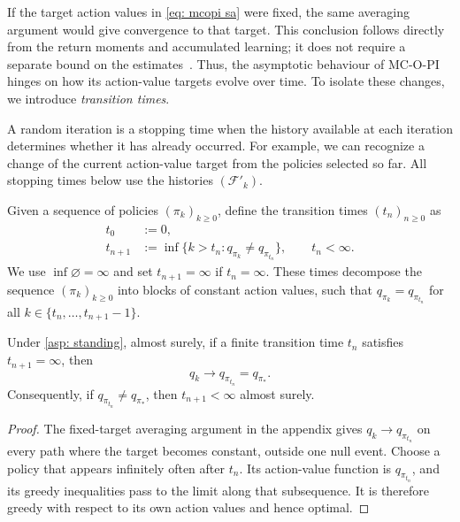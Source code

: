 
If the target action values in \eqref{eq: mcopi sa} were fixed, the same averaging argument would give convergence to that target. This conclusion follows directly from the return moments and accumulated learning; it does not require a separate bound on the estimates~\citep[Proposition~4.2]{Bertsekas1996Neuro-DynamicProgramming}.
Thus, the asymptotic behaviour of MC-O-PI hinges on how its action-value targets evolve over time. To isolate these changes, we introduce \textit{transition times}.

A random iteration is a stopping time when the history available at each iteration determines whether it has already occurred. For example, we can recognize a change of the current action-value target from the policies selected so far. All stopping times below use the histories $(\mathcal F'_k)$.

\begin{definition}
\label{def: transition times}
Given a sequence of policies $(\pi_k)_{k \ge 0}$,
define the transition times $(t_n)_{n \ge 0}$ as
\begin{align*}
t_0 &:= 0 ,
\\
t_{n+1} &:= \inf\{k>t_n : q_{\pi_k} \neq q_{\pi_{t_n}} \},\qquad t_n<\infty.
\end{align*}
We use $\inf\varnothing=\infty$ and set $t_{n+1}=\infty$ if $t_n=\infty$.
These times decompose the sequence $(\pi_k)_{k \ge 0}$ into blocks of constant action values, such that $q_{\pi_k} = q_{\pi_{t_n}}$ for all $k \in \{t_n, \dots, t_{n+1}-1 \}$.
\end{definition}

\begin{lemma}
\label{thm: suboptimal blocks finite}
Under \autoref{asp: standing}, almost surely, if a finite transition time $t_n$ satisfies $t_{n+1}=\infty$, then
\[
q_k\longrightarrow q_{\pi_{t_n}}=q_{\pi_*}.
\]
Consequently, if $q_{\pi_{t_n}}\ne q_{\pi_*}$, then $t_{n+1}<\infty$ almost surely.
\end{lemma}
\begin{proof}
The fixed-target averaging argument in the appendix gives $q_k\to q_{\pi_{t_n}}$ on every path where the target becomes constant, outside one null event.
Choose a policy that appears infinitely often after $t_n$. Its action-value function is $q_{\pi_{t_n}}$, and its greedy inequalities pass to the limit along that subsequence. It is therefore greedy with respect to its own action values and hence optimal.
\end{proof}





